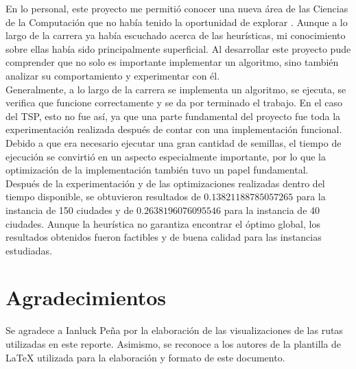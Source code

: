 \documentclass[twoside,11pt]{article}
\begin{document}
En lo personal, este proyecto me permitió conocer una nueva área de las Ciencias de la Computación que no había tenido la oportunidad de explorar . Aunque a lo largo de la carrera ya había escuchado acerca de las heurísticas, mi conocimiento sobre ellas había sido principalmente superficial. Al desarrollar este proyecto pude comprender que no solo es importante implementar un algoritmo, sino también analizar su comportamiento y experimentar con él.\\

Generalmente, a lo largo de la carrera se implementa un algoritmo, se ejecuta, se verifica que funcione correctamente y se da por terminado el trabajo. En el caso del TSP, esto no fue así, ya que una parte fundamental del proyecto fue toda la experimentación realizada después de contar con una implementación funcional. Debido a que era necesario ejecutar una gran cantidad de semillas, el tiempo de ejecución se convirtió en un aspecto especialmente importante, por lo que la optimización de la implementación también tuvo un papel fundamental.\\

Después de la experimentación y de las optimizaciones realizadas dentro del tiempo disponible, se obtuvieron resultados de $0.13821188785057265$ para la instancia de 150 ciudades y de $0.2638196076095546$ para la instancia de 40 ciudades. Aunque la heurística no garantiza encontrar el óptimo global, los resultados obtenidos fueron factibles y de buena calidad para las instancias estudiadas.


\section{Agradecimientos}

Se agradece a Ianluck Peña por la elaboración de las visualizaciones de las rutas utilizadas en este reporte. Asimismo, se reconoce a los autores de la plantilla de \LaTeX{} utilizada para la elaboración y formato de este documento. 

\nocite{*}

\end{document}

